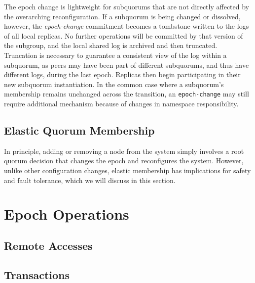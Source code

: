 \documentclass[sigplan,screen,review,anonymous,nonacm]{acmart}
\begin{document}
The epoch change is lightweight for subquorums that are not directly 
affected by the overarching reconfiguration.
If a subquorum is being changed or dissolved, however, the 
\emph{epoch-change} commitment becomes a tombstone written to the logs 
of all local replicas.
No further operations will be committed by that version of the subgroup, 
and the local shared log is archived and then truncated.
Truncation is necessary to guarantee a consistent view of the log within 
a subquorum, as peers may have been part of different subquorums, and 
thus have different logs, during the last epoch.
Replicas then begin participating in their new subquorum instantiation.
In the common case where a subquorum's membership remains unchanged 
across the transition, an \texttt{epoch-change} may still require 
additional mechanism because of changes in namespace responsibility.

\subsection{Elastic Quorum Membership}
In principle, adding or removing a node from the system simply involves a 
root quorum decision that changes the epoch and reconfigures the system. 
However, unlike other configuration changes, elastic membership has 
implications for safety and fault tolerance, which we will discuss in this 
section.


\section{Epoch Operations}

\subsection{Remote Accesses}

\subsection{Transactions}

\end{document}
